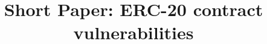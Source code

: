 \documentclass[compsoc,conference,a4paper,10pt,times]{IEEEtran}
\newcommand{\sys}{\textsf{TokenHook}\xspace}
\newcommand{\erc}{ERC-20\xspace}
\begin{document}
\title{Short Paper: \erc contract vulnerabilities}
\author{
	\IEEEauthorblockN{}
	\IEEEauthorblockA{}
}

\maketitle
\IEEEpubidadjcol

\IEEEpeerreviewmaketitle






{\footnotesize}
\clearpage
\appendices



\end{document}
